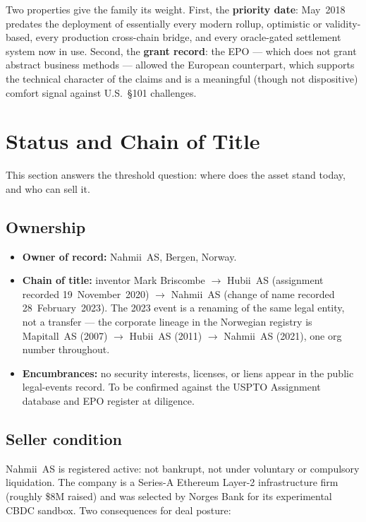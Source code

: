 \documentclass[11pt,a4paper]{article}
\begin{document}
Two properties give the family its weight. First, the \textbf{priority
date}: May~2018 predates the deployment of essentially every modern
rollup, optimistic or validity-based, every production cross-chain
bridge, and every oracle-gated settlement system now in use. Second,
the \textbf{grant record}: the EPO --- which does not grant abstract
business methods --- allowed the European counterpart, which supports
the technical character of the claims and is a meaningful (though not
dispositive) comfort signal against U.S.\ \S101 challenges.

\section{Status and Chain of Title}

This section answers the threshold question: where does the asset stand
today, and who can sell it.

\subsection{Ownership}

\begin{itemize}[leftmargin=1.4em]
  \item \textbf{Owner of record:} Nahmii~AS, Bergen, Norway.
  \item \textbf{Chain of title:} inventor Mark Briscombe
  $\rightarrow$ Hubii~AS (assignment recorded 19~November~2020)
  $\rightarrow$ Nahmii~AS (change of name recorded 28~February~2023).
  The 2023 event is a renaming of the same legal entity, not a
  transfer --- the corporate lineage in the Norwegian registry is
  Mapitall~AS (2007) $\rightarrow$ Hubii~AS (2011) $\rightarrow$
  Nahmii~AS (2021), one org number throughout.
  \item \textbf{Encumbrances:} no security interests, licenses, or
  liens appear in the public legal-events record. To be confirmed
  against the USPTO Assignment database and EPO register at diligence.
\end{itemize}

\subsection{Seller condition}

Nahmii~AS is registered active: not bankrupt, not under voluntary or
compulsory liquidation. The company is a Series-A Ethereum Layer-2
infrastructure firm (roughly \$8M raised) and was selected by Norges
Bank for its experimental CBDC sandbox. Two consequences for deal
posture:
\end{document}
